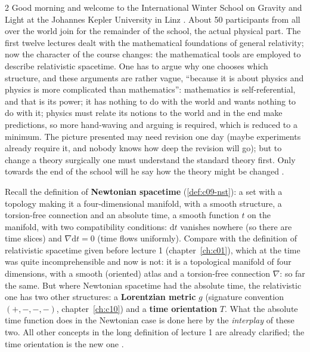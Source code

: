 \begin{paracol}{2}
Good morning and welcome to the International Winter School on Gravity and Light at the Johannes Kepler University in Linz . About 50 participants from all over the world join for the remainder of the school, the actual physical part. The first twelve lectures dealt with the mathematical foundations of general relativity; now the character of the course changes: the mathematical tools are employed to describe relativistic spacetime. One has to argue why one chooses which structure, and these arguments are rather vague, ``because it is about physics and physics is more complicated than mathematics'': mathematics is self-referential, and that is its power; it has nothing to do with the world and wants nothing to do with it; physics must relate its notions to the world and in the end make predictions, so more hand-waving and arguing is required, which is reduced to a minimum. The picture presented may need revision one day (maybe experiments already require it, and nobody knows how deep the revision will go); but to change a theory surgically one must understand the standard theory first. Only towards the end of the school will he say how the theory might be changed .

Recall the definition of \textbf{Newtonian spacetime} (\cref{def:c09-nst}): a set with a topology making it a four-dimensional manifold, with a smooth structure, a torsion-free connection and an absolute time, a smooth function $t$ on the manifold, with two compatibility conditions: $\mathrm dt$ vanishes nowhere (so there are time slices) and $\nabla\mathrm dt=0$ (time flows uniformly). Compare with the definition of relativistic spacetime given before lecture 1 (chapter~\ref{ch:c01}), which at the time was quite incomprehensible and now is not: it is a topological manifold of four dimensions, with a smooth (oriented) atlas and a torsion-free connection $\nabla$: so far the same. But where Newtonian spacetime had the absolute time, the relativistic one has two other structures: a \textbf{Lorentzian metric} $g$ (signature convention $(+,-,-,-)$, chapter~\ref{ch:c10}) and a \textbf{time orientation} $T$. What the absolute time function does in the Newtonian case is done here by the \emph{interplay} of these two. All other concepts in the long definition of lecture 1 are already clarified; the time orientation is the new one .


\end{paracol}
